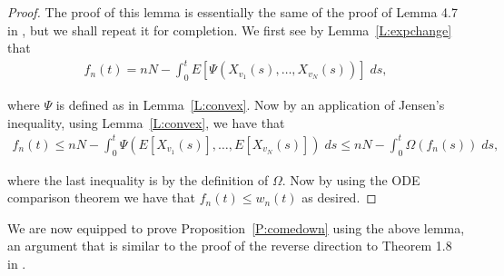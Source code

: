 \documentclass[11pt]{article}
\theoremstyle{definition}
\newcommand{\lemref}[1]{Lemma~\ref{L:#1}}
\newcommand{\propref}[1]{Proposition~\ref{P:#1}}
\begin{document}
\begin{proof}
    The proof of this lemma is essentially the same of the proof of Lemma 4.7 in \cite{Johnston2023}, but we shall repeat it for completion. We first see by \lemref{expchange} that 
    \begin{align*}
        f_n(t) = nN - \int_0^t E[\Psi(X_{v_1}(s), \ldots, X_{v_N}(s))]\;ds,
    \end{align*}

    \noindent where $\Psi$ is defined as in \lemref{convex}. Now by an application of Jensen's inequality, using \lemref{convex}, we have that
    \begin{align*}
        f_n(t) \leq nN -\int_0^t\Psi( E[X_{v_1}(s)], \ldots, E[X_{v_N}(s)])\;ds \leq nN -\int_0^t \Omega(f_n(s))\;ds,
    \end{align*}

    \noindent where the last inequality is by the definition of $\Omega$. Now by using the ODE comparison theorem we have that $f_n(t) \leq w_n(t)$ as desired.
\end{proof}

\noindent We are now equipped to prove \propref{comedown} using the above lemma, an argument that is similar to the proof of the reverse direction to Theorem 1.8 in \cite{Johnston2023}.
\end{document}
